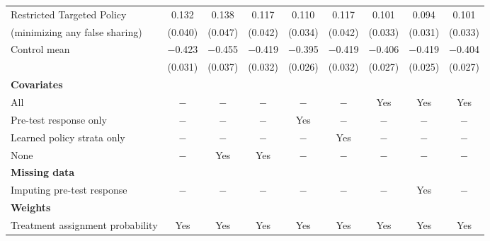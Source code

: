\begin{tabular}[t]{lcccccccc}
\hspace{1em}Restricted Targeted Policy & \num{0.132} & \num{0.138} & \num{0.117} & \num{0.110} & \num{0.117} & \num{0.101} & \num{0.094} & \num{0.101}\\
 \hspace{1.5em}(minimizing any false sharing) & (\num{0.040}) & (\num{0.047}) & (\num{0.042}) & (\num{0.034}) & (\num{0.042}) & (\num{0.033}) & (\num{0.031}) & (\num{0.033})\\\hline
\hspace{1em}Control mean & \num{-0.423} & \num{-0.455} & \num{-0.419} & \num{-0.395} & \num{-0.419} & \num{-0.406} & \num{-0.419} & \num{-0.404}\\
 & (\num{0.031}) & (\num{0.037}) & (\num{0.032}) & (\num{0.026}) & (\num{0.032}) & (\num{0.027}) & (\num{0.025}) & (\num{0.027})\\\hline
\hline

{\textbf{Covariates}} \rule{0pt}{1.2\normalbaselineskip}\\

\hspace{1em} All & $-$ & $-$ & $-$ &  $-$ &  $-$ & Yes & Yes & Yes \\

\hspace{1em} Pre-test response only & $-$  & $-$& $-$ & Yes &  $-$ &  $-$ &  $-$ &  $-$ \\

\hspace{1em} Learned policy strata only & $-$ & $-$ &  $-$ &  $-$ &  Yes &  $-$ &  $-$ & $-$  \\

\hspace{1em} None & $-$ &Yes &  Yes &$-$ &   $-$ &  $-$ &  $-$ &  $-$ \\

{\textbf{Missing data}} \rule{0pt}{1.2\normalbaselineskip}\\

\hspace{1em} Imputing pre-test response & $-$ & $-$ &  $-$ &  $-$ &  $-$ &  $-$ & Yes &  $-$  \\

{\textbf{Weights}} \rule{0pt}{1.2\normalbaselineskip}\\

\hspace{1em} Treatment assignment probability &Yes &Yes  & Yes & Yes & Yes & Yes & Yes & Yes \\


\end{tabular}
